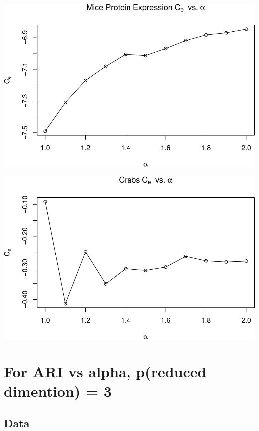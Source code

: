 \documentclass[]{article}
\begin{document}
\begin{center}\includegraphics[width=1\linewidth]{Report_files/figure-latex/unnamed-chunk-20-6} \end{center}

\begin{center}\includegraphics[width=1\linewidth]{Report_files/figure-latex/unnamed-chunk-20-7} \end{center}

\section{For ARI vs alpha, p(reduced dimention) =
3}\label{for-ari-vs-alpha-preduced-dimention-3}

\subsection{Data}\label{data-1}
\end{document}
